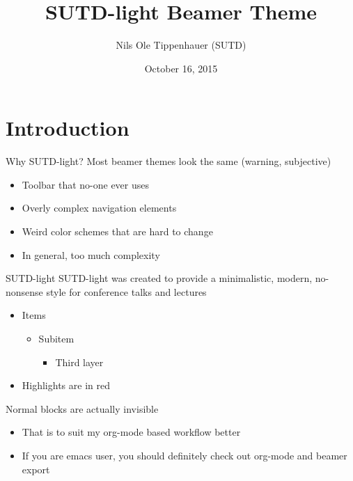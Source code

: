 \documentclass[presentation, aspectratio=54]{beamer}
\author{Nils Ole Tippenhauer (SUTD)}
\date{October 16, 2015}
\title{SUTD-light Beamer Theme}
\begin{document}
\maketitle
\section{Introduction}

\begin{frame}{Why SUTD-light?}
Most beamer themes look the same (warning, subjective)
\begin{itemize}
\item Toolbar that no-one ever uses
\item Overly complex navigation elements
\item Weird color schemes that are hard to change
\item In general, too much complexity
\end{itemize}
\end{frame}

\begin{frame}{SUTD-light}
SUTD-light was created to provide a minimalistic, modern, no-nonsense style for conference talks and lectures
\begin{itemize}
\item Items
\begin{itemize}
\item Subitem
\begin{itemize}
\item Third layer
\end{itemize}
\end{itemize}
\item \alert{Highlights} are in red
\end{itemize}
\begin{block}{Normal blocks are actually invisible}
\begin{itemize}
\item That is to suit my org-mode based workflow better
\item If you are emacs user, you should definitely check out org-mode and beamer export
\end{itemize}
\end{block}
\end{frame}
\end{document}
